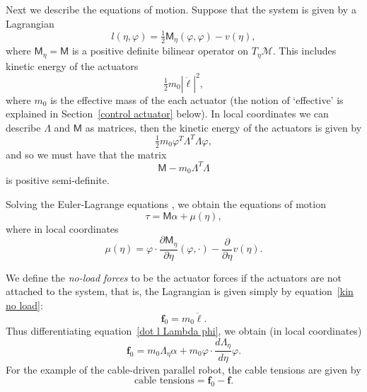 \documentclass[oneside,twocolumn,reqno]{amsart}
\begin{document}
Next we describe the equations of motion.  Suppose that the system is given by a Lagrangian
\begin{equation}
l(\eta,\varphi) = \tfrac12 \mathsf M_\eta(\varphi,\varphi) - v(\eta),
\end{equation}
where $\mathsf M_\eta = \mathsf M$ is a positive definite bilinear operator on $T_\eta\mathcal M$.  This includes kinetic energy of the actuators
\begin{equation}
\label{kin no load}
\tfrac 12 m_0 |\dot{\bm\ell}|^2,
\end{equation}
where $m_0$ is the effective mass of the each actuator (the notion of `effective' is explained in Section~\ref{control actuator} below).  In local coordinates we can describe $\mathsf\Lambda$ and $\mathsf M$ as matrices, then the kinetic energy of the actuators is given by
\begin{equation}
\tfrac12 m_0 \varphi^T \mathsf \Lambda^T \mathsf \Lambda \varphi,
\end{equation}
and so we must have that the matrix
\begin{equation}
\mathsf M - m_0 \mathsf \Lambda^T \mathsf \Lambda
\end{equation}
is positive semi-definite.

Solving the Euler-Lagrange equations \cite{arnold}, we obtain the equations of motion
\begin{equation}
\tau = \mathsf M \alpha + \mu(\eta) ,
\end{equation}
where in local coordinates
\begin{equation}
\mu(\eta) = \varphi \cdot \frac {\partial \mathsf M_\eta}{\partial \eta} (\varphi,\cdot) - \frac{\partial}{\partial \eta} v(\eta) .
\end{equation}

We define the \emph{no-load forces} to be the actuator forces if the actuators are not attached to the system, that is, the Lagrangian is given simply by equation~\eqref{kin no load}:
\begin{equation}
\bm f_0 = m_0 \ddot{\bm\ell}.
\end{equation}
Thus differentiating equation~\eqref{dot l Lambda phi}, we obtain (in local coordinates)
\begin{equation}
\label{f_0}
\bm f_0 = m_0 \mathsf\Lambda_\eta \alpha + m_0 \varphi \cdot \frac{d\Lambda_\eta}{d\eta} \varphi .
\end{equation}
For the example of the cable-driven parallel robot, the cable tensions are given by
\begin{equation}
\text{cable tensions} = \bm f_0 - \bm f.
\end{equation}
\end{document}
